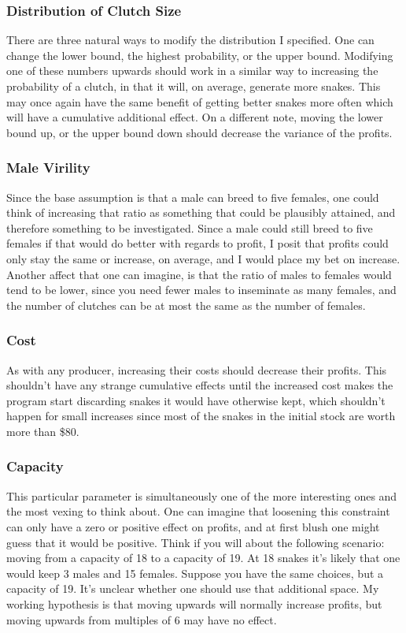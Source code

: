 \documentclass{article}
\begin{document}
		\subsubsection*{Distribution of Clutch Size}
		There are three natural ways to modify the distribution I specified. One can change the lower bound, the highest probability, or the upper bound. Modifying one of these numbers upwards should work in a similar way to increasing the probability of a clutch, in that it will, on average, generate more snakes. This may once again have the same benefit of getting better snakes more often which will have a cumulative additional effect. On a different note, moving the lower bound up, or the upper bound down should decrease the variance of the profits.
		\subsubsection*{Male Virility}
		Since the base assumption is that a male can breed to five females, one could think of increasing that ratio as something that could be plausibly attained, and therefore something to be investigated. Since a male could still breed to five females if that would do better with regards to profit, I posit that profits could only stay the same or increase, on average, and I would place my bet on increase. Another affect that one can imagine, is that the ratio of males to females would tend to be lower, since you need fewer males to inseminate as many females, and the number of clutches can be at most the same as the number of females.
		\subsubsection*{Cost}
		As with any producer, increasing their costs should decrease their profits. This shouldn't have any strange cumulative effects until the increased cost makes the program start discarding snakes it would have otherwise kept, which shouldn't happen for small increases since most of the snakes in the initial stock are worth more than \$80.
		\subsubsection*{Capacity}
		This particular parameter is simultaneously one of the more interesting ones and the most vexing to think about. One can imagine that loosening this constraint can only have a zero or positive effect on profits, and at first blush one might guess that it would be positive. Think if you will about the following scenario: moving from a capacity of 18 to a capacity of 19. At 18 snakes it's likely that one would keep 3 males and 15 females. Suppose you have the same choices, but a capacity of 19. It's unclear whether one should use that additional space. My working hypothesis is that moving upwards will normally increase profits, but moving upwards from multiples of 6 may have no effect.
\end{document}
